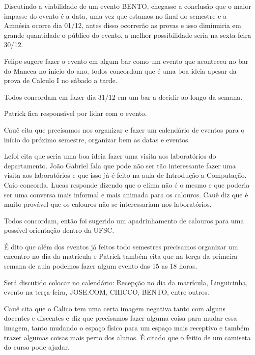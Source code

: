 \documentclass{ata-calico}
\begin{document}
\maketitle

Discutindo a viabilidade de um evento BENTO, chegasse a conclusão que o maior impasse do evento é a data, uma vez que estamos no final do semestre e a Amnésia ocorre dia 01/12, antes disso ocorrerão as provas e isso diminuiria em grande quantidade o público do evento, a melhor possíbilidade seria na sexta-feira 30/12.

Felipe sugere fazer o evento em algum bar como um evento que aconteceu no bar do
Maneca no início do ano, todos concordam que é uma boa ideia apesar da prova de 
Calculo I no sábado a tarde.

Todos concordam em fazer dia 31/12 em um bar a decidir ao longo da semana.

Patrick fica responsável por lidar com o evento.

Cauê cita que precisamos nos organizar e fazer um calendário de eventos para o início
do próximo semestre, organizar bem as datas e eventos.

Lefol cita que seria uma boa ideia fazer uma visita aos laboratórios do departamento.
João Gabriel fala que pode não ser tão interessante fazer uma visita aos laboratórios
e que isso já é feito na aula de Introdução a Computação. Caio concorda.
Lucas responde dizendo que o clima não é o mesmo e que poderia ser uma conversa mais
informal e mais animada para os calouros.
Cauê diz que é muito provável que os calouros não se interessariam nos laboratórios.

Todos concordam, então foi sugerido um apadrinhamento de calouros para uma possível
orientação dentro da UFSC.

É dito que além dos eventos já feitos todo semestres precisamos organizar um
encontro no dia da matrícula e Patrick também cita que na terça da primeira semana 
de aula podemos fazer algum evento das 15 as 18 horas.

Será discutido colocar no calendário: Recepção no dia da matrícula, Linguicinha, 
evento na terça-feira, JOSE.COM, CHICCO, BENTO, entre outros.

Cauê cita que o Calico tem uma certa imagem negativa tanto com alguns docentes e 
discentes e diz que precisamos fazer alguma coisa para mudar essa imagem, tanto 
mudando o espaço físico para um espaço mais receptivo e também trazer algumas coisas
mais perto dos alunos. É citado que o feitio de um camiseta do curso pode ajudar.
\end{document}
